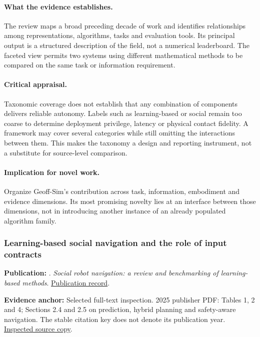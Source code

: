 \paragraph{What the evidence establishes.} The review maps a broad preceding decade of work and identifies relationships among representations, algorithms, tasks and evaluation tools. Its principal output is a structured description of the field, not a numerical leaderboard. The faceted view permits two systems using different mathematical methods to be compared on the same task or information requirement.

\paragraph{Critical appraisal.} Taxonomic coverage does not establish that any combination of components delivers reliable autonomy. Labels such as learning-based or social remain too coarse to determine deployment privilege, latency or physical contact fidelity. A framework may cover several categories while still omitting the interactions between them. This makes the taxonomy a design and reporting instrument, not a substitute for source-level comparison.

\paragraph{Implication for novel work.} Organize Geoff-Sim's contribution across task, information, embodiment and evidence dimensions. Its most promising novelty lies at an interface between those dimensions, not in introducing another instance of an already populated algorithm family.

\subsubsection{Learning-based social navigation and the role of input contracts}\label{paper:survey2023}
\textbf{Publication:} \citet{survey2023}. \emph{Social robot navigation: a review and benchmarking of learning-based methods}. \href{https://doi.org/10.3389/frobt.2025.1658643}{Publication record}.

\textbf{Evidence anchor:} Selected full-text inspection. 2025 publisher PDF: Tables 1, 2 and 4; Sections 2.4 and 2.5 on prediction, hybrid planning and safety-aware navigation. The stable citation key does not denote its publication year. \href{https://public-pages-files-2025.frontiersin.org/journals/robotics-and-ai/articles/10.3389/frobt.2025.1658643/pdf}{Inspected source copy}.

